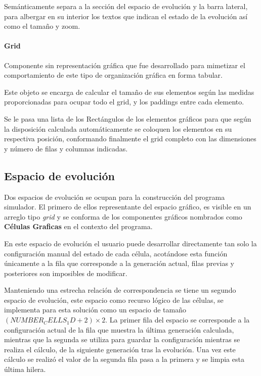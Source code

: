 \documentclass[]{article}
\begin{document}
				\hfill\break
				\justifying
				Semánticamente separa a la sección del espacio de evolución y la barra lateral, para albergar en su interior los textos que indican el estado de la evolución así como el tamaño y zoom.
				
				\paragraph{Grid}
				\justifying
				Componente sin representación gráfica que fue desarrollado para mimetizar el comportamiento de este tipo de organización gráfica en forma tabular.
				
				\hfill\break
				\justifying
				Este objeto se encarga de calcular el tamaño de sus elementos según las medidas proporcionadas para ocupar todo el grid, y los paddings entre cada elemento.
				
				\hfill\break
				\justifying
				Se le pasa una lista de los Rectángulos de los elementos gráficos para que según la disposición calculada automáticamente se coloquen los elementos en su respectiva posición, conformando finalmente el grid completo con las dimensiones y número de filas y columnas indicadas.

		\newpage
		\subsection{Espacio de evolución}
			\justifying
			Dos espacios de evolución se ocupan para la construcción del programa simulador. El primero de ellos representante del espacio gráfico, es visible en un arreglo tipo \textit{grid} y se conforma de los componentes gráficos nombrados como \textbf{Células Graficas} en el contexto del programa.
			
			\hfill\break
			\justifying
			En este espacio de evolución el usuario puede desarrollar directamente tan solo la configuración manual del estado de cada célula, acotándose esta función únicamente a la fila que corresponde a la generación actual, filas previas y posteriores son imposibles de modificar.
			
			\hfill\break
			\justifying
			Manteniendo una estrecha relación de correspondencia se tiene un segundo espacio de evolución, este espacio como recurso lógico de las células, se implementa para esta solución como un espacio de tamaño $(NUMBER_CELLS_1D + 2) \times 2$.
			La primer fila del espacio se corresponde a la configuración actual de la fila que muestra la última generación calculada, mientras que la segunda se utiliza para guardar la configuración mientras se realiza el cálculo, de la siguiente generación tras la evolución. Una vez este cálculo se realizó el valor de la segunda fila pasa a la primera y se limpia esta última hilera.
			
\end{document}
